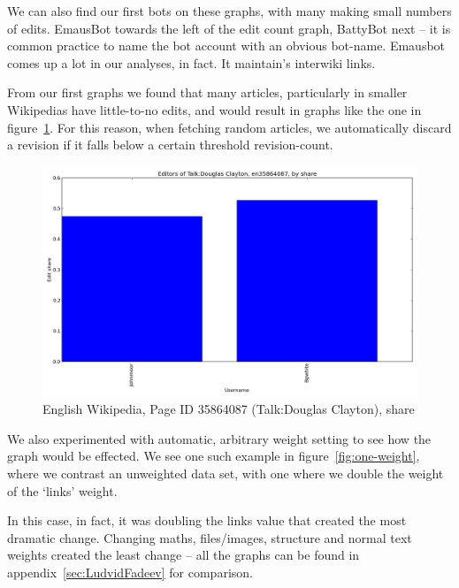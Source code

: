 We can also find our first bots on these graphs, with many making
small numbers of edits. EmausBot towards the left of the edit count
graph, BattyBot next -- it is common practice to name the bot account
with an obvious bot-name. Emausbot comes up a lot in our analyses, in
fact. It maintain's interwiki links.

From our first graphs we found that many articles, particularly in
smaller Wikipedias have little-to-no edits, and would result in graphs
like the one in figure~\ref{fig:useless-share}. For this reason, when
fetching random articles, we automatically discard a revision if it
falls below a certain threshold revision-count.

\begin{figure}
  \includegraphics[width=1\linewidth]{img/useless/Talk:DouglasClayton.png}
  \caption{English Wikipedia, Page ID 35864087 (Talk:Douglas
    Clayton), share}
  \label{fig:useless-share}
\end{figure}

We also experimented with automatic, arbitrary weight setting to see
how the graph would be effected. We see one such example in
figure~\ref{fig:one-weight}, where we contrast an unweighted data set,
with one where we double the weight of the `links' weight.

In this case, in fact, it was doubling the links value that created
the most dramatic change. Changing maths, files/images, structure and
normal text weights created the least change -- all the graphs can be
found in appendix~\ref{sec:LudvidFadeev} for comparison.


